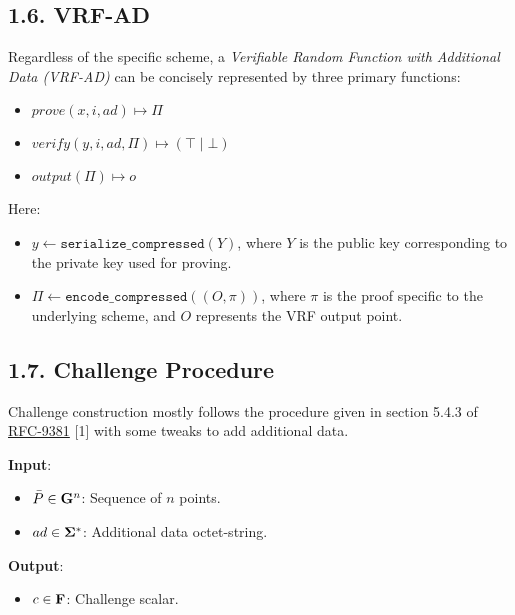 \documentclass[
]{article}
\providecommand{\tightlist}{%
  \setlength{\itemsep}{0pt}\setlength{\parskip}{0pt}}
\begin{document}
\subsection{1.6. VRF-AD}\label{vrf-ad}

Regardless of the specific scheme, a \emph{Verifiable Random Function
with Additional Data (VRF-AD)} can be concisely represented by three
primary functions:

\begin{itemize}
\tightlist
\item
  \(prove(x, i, ad) \mapsto \Pi\)
\item
  \(verify(y, i, ad, \Pi) \mapsto (\top \mid \bot)\)
\item
  \(output(\Pi) \mapsto o\)
\end{itemize}

Here:

\begin{itemize}
\tightlist
\item
  \(y \gets \texttt{serialize\_compressed}(Y)\), where \(Y\) is the
  public key corresponding to the private key used for proving.
\item
  \(\Pi \gets \texttt{encode\_compressed}((O, \pi))\), where \(\pi\) is
  the proof specific to the underlying scheme, and \(O\) represents the
  VRF output point.
\end{itemize}

\subsection{1.7. Challenge Procedure}\label{challenge-procedure}

Challenge construction mostly follows the procedure given in section
5.4.3 of \href{https://datatracker.ietf.org/doc/rfc9381}{RFC-9381}
{[}1{]} with some tweaks to add additional data.

\textbf{Input}:

\begin{itemize}
\tightlist
\item
  \(\bar{P} \in \bold{G}^n\): Sequence of \(n\) points.
\item
  \(ad \in \bold{\Sigma}^*\): Additional data octet-string.
\end{itemize}

\textbf{Output}:

\begin{itemize}
\tightlist
\item
  \(c \in \bold{F}\): Challenge scalar.
\end{itemize}
\end{document}
